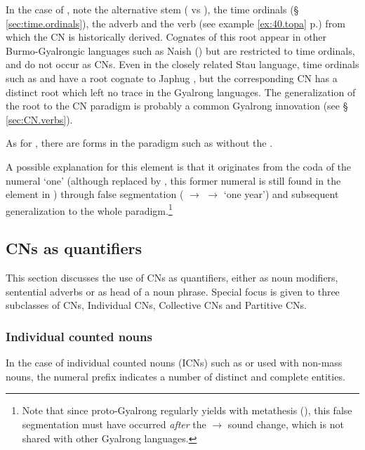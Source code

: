 In the case of , note the alternative stem  ( vs ), the time ordinals (§ \ref{sec:time.ordinals}), the adverb  and the verb   (see example \ref{ex:40.topa} p.\pageref{ex:40.topa}) from which the CN  is historically derived. Cognates of this root  appear in other Burmo-Gyalrongic languages such as Naish (\citealt{jacques.michaud11naish}) but are restricted to time ordinals, and do not occur as CNs. Even in the closely related Stau language,  time ordinals such as  and  have a root  cognate to Japhug , but the corresponding CN  has a distinct root which left no trace in the Gyalrong languages. The generalization of the  root to the CN paradigm is probably a common Gyalrong innovation (see § \ref{sec:CN.verbs}).

As for , there are forms in the paradigm such as  without the . 

A possible explanation for this  element is that it originates from the coda of the numeral `one' (although replaced by , this former numeral is still found in the element  in ) through false segmentation ( $\rightarrow$  $\rightarrow$  `one year') and subsequent generalization to the whole paradigm.\footnote{Note that since proto-Gyalrong  regularly yields  with metathesis (\citealt[272]{jacques04these}), this false segmentation must have occurred \textit{after} the  $\rightarrow$ sound change, which is not shared with other Gyalrong languages. }


\subsection{CNs as quantifiers} \label{sec:CN.quantifier}
This section discusses the use of CNs as quantifiers, either as noun modifiers, sentential adverbs or as head of a noun phrase. Special focus is given to three subclasses of CNs, Individual CNs, Collective CNs and Partitive CNs.

\subsubsection{Individual counted nouns} \label{sec:ICN}
In the case of individual counted nouns (ICNs) such as  or  used with non-mass nouns, the numeral prefix indicates a number of distinct and complete entities.

